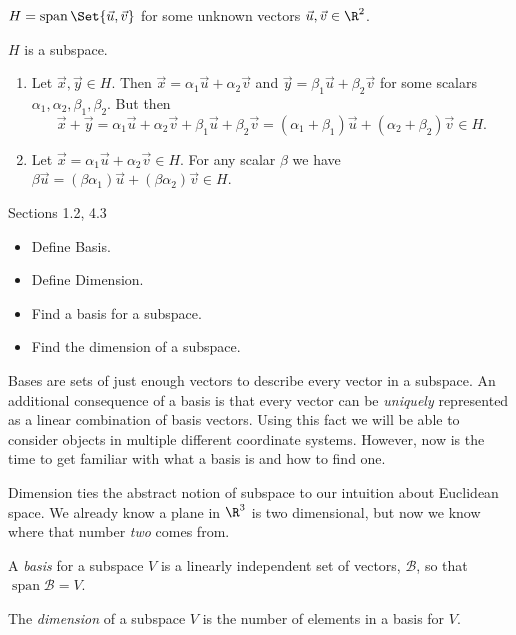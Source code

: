 \documentclass{problemset}
\DeclareMathOperator{\Span}{span}
\begin{document}
\begin{parts}
\begin{solution}
		\end{solution}
		\item $H=\Span\Set{\vec u,\vec v}$ for some unknown vectors $\vec u,\vec v\in\R^2$.
			\begin{solution}
				$H$ is a subspace.

				\begin{enumerate}[label=(\roman*)]
					\item Let $\vec x,\vec y\in H$.
						Then $\vec x=\alpha_1\vec u+\alpha_2\vec v$ and
						$\vec y=\beta_1\vec u+\beta_2\vec v$ for some scalars
						$\alpha_1,\alpha_2,\beta_1,\beta_2$. But then
						\[
							\vec x+\vec y
							=\alpha_1\vec u+\alpha_2\vec v+\beta_1\vec u+\beta_2\vec v
							=(\alpha_1+\beta_1)\vec u+(\alpha_2+\beta_2)\vec v\in H.
						\]

					\item Let $\vec x=\alpha_1\vec u+\alpha_2\vec v\in H$.
						For any	scalar $\beta$ we have
						$\beta\vec u=(\beta\alpha_1)\vec u+(\beta\alpha_2)\vec v\in H$.
				\end{enumerate}
			\end{solution}
	\end{parts}

\begin{lesson}

	Sections 1.2, 4.3

	\begin{itemize}
		\item Define Basis.
		\item Define Dimension.
		\item Find a basis for a subspace.
		\item Find the dimension of a subspace.
	\end{itemize}

	Bases are sets of just enough vectors to describe every vector in a subspace.
	An additional consequence of a basis is that every vector can be \emph{uniquely}
	represented as a linear combination of basis vectors. Using this fact we
	will be able to consider objects in multiple different coordinate systems. However,
	now is the time to get familiar with what a basis is and how to find one.

	Dimension ties the abstract notion of subspace to our intuition about
	Euclidean space. We already know a plane in $\R^3$ is two dimensional,
	but now we know where that number \emph{two} comes from.

\end{lesson}
	\begin{definition}[Basis]
		A \emph{basis} for a subspace $V$ is a linearly independent set of vectors, $\mathcal B$,
		so that $\Span\mathcal B=V$.
	\end{definition}
	\begin{definition}[Dimension]
		The \emph{dimension} of a subspace $V$ is the number of elements in a basis for $V$.
	\end{definition}
\end{document}
